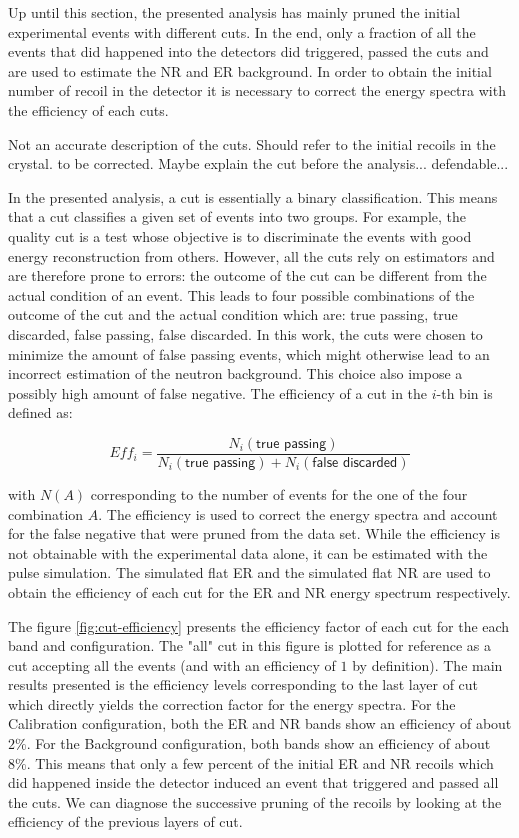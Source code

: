 Up until this section, the presented analysis has mainly pruned the initial experimental events with different cuts. In the end, only a fraction of all the events that did happened into the detectors did triggered, passed the cuts and are used to estimate the NR and ER background. In order to obtain the initial number of recoil in the detector it is necessary to correct the energy spectra with the efficiency of each cuts.

{\color{red} Not an accurate description of the cuts. Should refer to the initial recoils in the crystal. to be corrected. Maybe explain the cut before the analysis... defendable...}

In the presented analysis, a cut is essentially a binary classification. This means that a cut classifies a given set of events into two groups. For example, the quality cut is a test whose objective is to discriminate the events with good energy reconstruction from others. However, all the cuts rely on estimators and are therefore prone to errors: the outcome of the cut can be different from the actual condition of an event. This leads to four possible combinations of the outcome of the cut and the actual condition which are: true passing, true discarded, false passing, false discarded.
In this work, the cuts were chosen to minimize the amount of false passing events, which might otherwise lead to an incorrect estimation of the neutron background. This choice also impose a possibly high amount of false negative. The efficiency of a cut in the $i$-th bin is defined as:

\begin{equation}
	Eff_{i} = \frac{ N_i\left( \textsf{true passing} \right) }{ N_i \left( \textsf{true passing} \right) + N_i \left( \textsf{false discarded} \right) }
\end{equation}

with $N(A)$ corresponding to the number of events for the one of the four combination $A$.
The efficiency is used to correct the energy spectra and account for the false negative that were pruned from the data set. 
While the efficiency is not obtainable with the experimental data alone, it can be estimated with the pulse simulation. The simulated flat ER and the simulated flat NR are used to obtain the efficiency of each cut for the ER and NR energy spectrum respectively.

The figure \ref{fig:cut-efficiency} presents the efficiency factor of each cut for the each band and configuration. The "all" cut in this figure is plotted for reference as a cut accepting all the events (and with an efficiency of $1$ by definition). The main results presented is the efficiency levels corresponding to the last layer of cut which directly yields the correction factor for the energy spectra. For the Calibration configuration, both the ER and NR bands show an efficiency of about $2\%$. For the Background configuration, both bands show an efficiency of about $8\%$. This means that only a few percent of the initial ER and NR recoils which did happened inside the detector induced an event that triggered and passed all the cuts. We can diagnose the successive pruning of the recoils by looking at the efficiency of the previous layers of cut.

